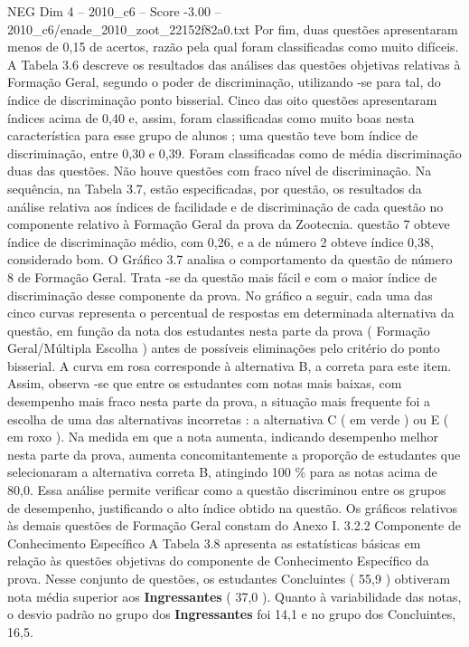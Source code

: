 \begin{textsample}{NEG Dim 4 – 2010\_c6 – Score -3.00 – 2010\_c6/enade\_2010\_zoot\_22152f82a0.txt}
Por fim, duas questões apresentaram menos de 0,15 de acertos, razão pela qual foram classificadas como muito difíceis.
A Tabela 3.6 descreve os resultados das análises das questões objetivas relativas à Formação Geral, segundo o poder de discriminação, utilizando -se para tal, do índice de discriminação ponto bisserial.
Cinco das oito questões apresentaram índices acima de 0,40 e, assim, foram classificadas como muito boas nesta característica para esse grupo de alunos ; uma questão teve bom índice de discriminação, entre 0,30 e 0,39.
Foram classificadas como de média discriminação duas das questões.
Não houve questões com fraco nível de discriminação.
Na sequência, na Tabela 3.7, estão especificadas, por questão, os resultados da análise relativa aos índices de facilidade e de discriminação de cada questão no componente relativo à Formação Geral da prova da Zootecnia. questão 7 obteve índice de discriminação médio, com 0,26, e a de número 2 obteve índice 0,38, considerado bom.
O Gráfico 3.7 analisa o comportamento da questão de número 8 de Formação Geral.
Trata -se da questão mais fácil e com o maior índice de discriminação desse componente da prova.
No gráfico a seguir, cada uma das cinco curvas representa o percentual de respostas em determinada alternativa da questão, em função da nota dos estudantes nesta parte da prova ( Formação Geral/Múltipla Escolha ) antes de possíveis eliminações pelo critério do ponto bisserial.
A curva em rosa corresponde à alternativa B, a correta para este item.
Assim, observa -se que entre os estudantes com notas mais baixas, com desempenho mais fraco nesta parte da prova, a situação mais frequente foi a escolha de uma das alternativas incorretas : a alternativa C ( em verde ) ou E ( em roxo ).
Na medida em que a nota aumenta, indicando desempenho melhor nesta parte da prova, aumenta concomitantemente a proporção de estudantes que selecionaram a alternativa correta B, atingindo 100 \% para as notas acima de 80,0.
Essa análise permite verificar como a questão discriminou entre os grupos de desempenho, justificando o alto índice obtido na questão.
Os gráficos relativos às demais questões de Formação Geral constam do Anexo I. 3.2.2 Componente de Conhecimento Específico A Tabela 3.8 apresenta as estatísticas básicas em relação às questões objetivas do componente de Conhecimento Específico da prova.
Nesse conjunto de questões, os estudantes Concluintes ( 55,9 ) obtiveram nota média superior aos \textbf{Ingressantes} ( 37,0 ).
Quanto à variabilidade das notas, o desvio padrão no grupo dos \textbf{Ingressantes} foi 14,1 e no grupo dos Concluintes, 16,5.

\end{textsample}
